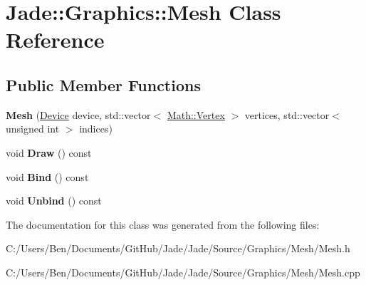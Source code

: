 \hypertarget{class_jade_1_1_graphics_1_1_mesh}{}\section{Jade\+:\+:Graphics\+:\+:Mesh Class Reference}
\label{class_jade_1_1_graphics_1_1_mesh}
\subsection*{Public Member Functions}
\begin{DoxyCompactItemize}
\item 
\hypertarget{class_jade_1_1_graphics_1_1_mesh_a7f088e578ccf88621257a1b703a83481}{}{\bfseries Mesh} (\hyperlink{class_jade_1_1_graphics_1_1_device}{Device} device, std\+::vector$<$ \hyperlink{struct_jade_1_1_math_1_1_vertex}{Math\+::\+Vertex} $>$ vertices, std\+::vector$<$ unsigned int $>$ indices)\label{class_jade_1_1_graphics_1_1_mesh_a7f088e578ccf88621257a1b703a83481}

\item 
\hypertarget{class_jade_1_1_graphics_1_1_mesh_aab6996e51de3121c2aa0630208d2c344}{}void {\bfseries Draw} () const \label{class_jade_1_1_graphics_1_1_mesh_aab6996e51de3121c2aa0630208d2c344}

\item 
\hypertarget{class_jade_1_1_graphics_1_1_mesh_a452aadf2a87307d19b088b9bc2776b07}{}void {\bfseries Bind} () const \label{class_jade_1_1_graphics_1_1_mesh_a452aadf2a87307d19b088b9bc2776b07}

\item 
\hypertarget{class_jade_1_1_graphics_1_1_mesh_aaf5c688a1cab7121aca17b87898ed8bd}{}void {\bfseries Unbind} () const \label{class_jade_1_1_graphics_1_1_mesh_aaf5c688a1cab7121aca17b87898ed8bd}

\end{DoxyCompactItemize}


The documentation for this class was generated from the following files\+:\begin{DoxyCompactItemize}
\item 
C\+:/\+Users/\+Ben/\+Documents/\+Git\+Hub/\+Jade/\+Jade/\+Source/\+Graphics/\+Mesh/Mesh.\+h\item 
C\+:/\+Users/\+Ben/\+Documents/\+Git\+Hub/\+Jade/\+Jade/\+Source/\+Graphics/\+Mesh/Mesh.\+cpp\end{DoxyCompactItemize}
